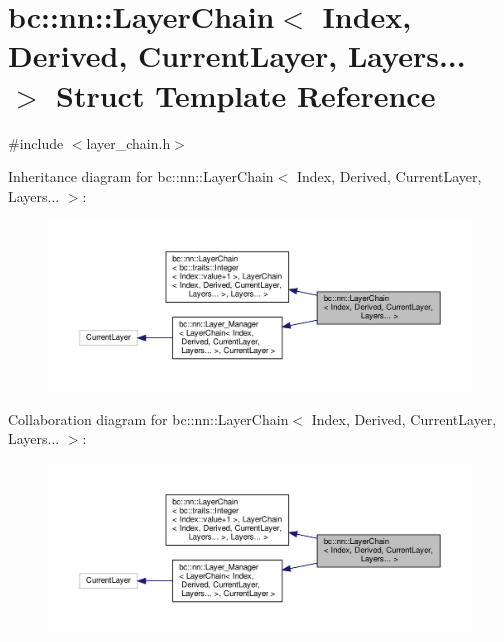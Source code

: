 \hypertarget{structbc_1_1nn_1_1LayerChain_3_01Index_00_01Derived_00_01CurrentLayer_00_01Layers_8_8_8_01_4}{}\section{bc\+:\+:nn\+:\+:Layer\+Chain$<$ Index, Derived, Current\+Layer, Layers... $>$ Struct Template Reference}
\label{structbc_1_1nn_1_1LayerChain_3_01Index_00_01Derived_00_01CurrentLayer_00_01Layers_8_8_8_01_4}


{\ttfamily \#include $<$layer\+\_\+chain.\+h$>$}



Inheritance diagram for bc\+:\+:nn\+:\+:Layer\+Chain$<$ Index, Derived, Current\+Layer, Layers... $>$\+:\nopagebreak
\begin{figure}[H]
\begin{center}
\leavevmode
\includegraphics[width=350pt]{structbc_1_1nn_1_1LayerChain_3_01Index_00_01Derived_00_01CurrentLayer_00_01Layers_8_8_8_01_4__inherit__graph}
\end{center}
\end{figure}


Collaboration diagram for bc\+:\+:nn\+:\+:Layer\+Chain$<$ Index, Derived, Current\+Layer, Layers... $>$\+:\nopagebreak
\begin{figure}[H]
\begin{center}
\leavevmode
\includegraphics[width=350pt]{structbc_1_1nn_1_1LayerChain_3_01Index_00_01Derived_00_01CurrentLayer_00_01Layers_8_8_8_01_4__coll__graph}
\end{center}
\end{figure}
